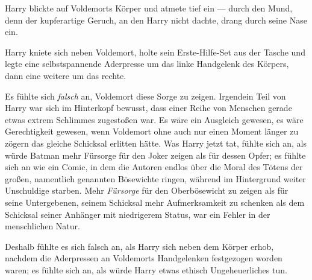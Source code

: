Harry blickte auf Voldemorts Körper und atmete tief ein — durch den Mund, denn der kupferartige Geruch, an den Harry nicht dachte, drang durch seine Nase ein.

Harry kniete sich neben Voldemort, holte sein Erste-Hilfe-Set aus der Tasche und legte eine selbstspannende Aderpresse um das linke Handgelenk des Körpers, dann eine weitere um das rechte.

Es fühlte sich \emph{falsch} an, Voldemort diese Sorge zu zeigen. Irgendein Teil von Harry war sich im Hinterkopf bewusst, dass einer Reihe von Menschen gerade etwas extrem Schlimmes zugestoßen war. Es wäre ein Ausgleich gewesen, es wäre Gerechtigkeit gewesen, wenn Voldemort ohne auch nur einen Moment länger zu zögern das gleiche Schicksal erlitten hätte. Was Harry jetzt tat, fühlte sich an, als würde Batman mehr Fürsorge für den Joker zeigen als für dessen Opfer; es fühlte sich an wie ein Comic, in dem die Autoren endlos über die Moral des Tötens der großen, namentlich genannten Bösewichte ringen, während im Hintergrund weiter Unschuldige starben. Mehr \emph{Fürsorge} für den Oberbösewicht zu zeigen als für seine Untergebenen, seinem Schicksal mehr Aufmerksamkeit zu schenken als dem Schicksal seiner Anhänger mit niedrigerem Status, war ein Fehler in der menschlichen Natur.

Deshalb fühlte es sich falsch an, als Harry sich neben dem Körper erhob, nachdem die Aderpressen an Voldemorts Handgelenken festgezogen worden waren; es fühlte sich an, als würde Harry etwas ethisch Ungeheuerliches tun.

